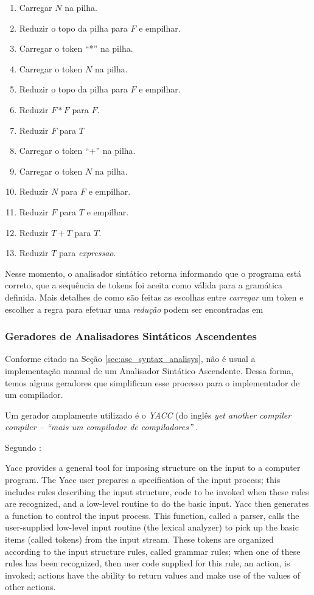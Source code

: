 \begin{enumerate}
  \item Carregar $N$ na pilha.
  \item Reduzir o topo da pilha para $F$ e empilhar.
  \item Carregar o token ``*'' na pilha.
  \item Carregar o token $N$ na pilha.
  \item Reduzir o topo da pilha para $F$ e empilhar.
  \item Reduzir $F*F$ para $F$.
	\item Reduzir $F$ para $T$
  \item Carregar o token ``+'' na pilha.
  \item Carregar o token $N$ na pilha.
  \item Reduzir $N$ para $F$ e empilhar.
  \item Reduzir $F$ para $T$ e empilhar.
  \item Reduzir $T+T$ para $T$.
	\item Reduzir $T$ para \emph{expressao}.
\end{enumerate}

Nesse momento, o analisador sintático retorna informando que o programa está
correto, que a sequência de tokens foi aceita como válida para a gramática
definida. Mais detalhes de como são feitas as escolhas entre \emph{carregar} um token
e escolher a regra para efetuar uma \emph{redução} podem ser encontradas em

\subsubsection{Geradores de Analisadores Sintáticos Ascendentes}
\label{sec:yacc}

Conforme citado na Seção \ref{sec:asc_syntax_analisys}, não é usual a
implementação manual de um Analisador Sintático Ascendente. Dessa forma, temos
alguns geradores que simplificam esse processo para o implementador de um
compilador.

Um gerador amplamente utilizado é o \emph{YACC} (do inglês \emph{yet another
compiler compiler {--} ``mais um compilador de compiladores''}
\cite{louden97-pt}.

Segundo :

\begin{citacao}{4cm}{0cm}
Yacc provides a general tool for imposing structure on the input to a computer
program. The Yacc user prepares a specification of the input process; this
includes rules describing the input structure, code to be invoked when these
rules are recognized, and a low-level routine to do the basic input. Yacc then
generates a function to control the input process. This function, called a
parser, calls the user-supplied low-level input routine (the lexical analyzer)
to pick up the basic items (called tokens) from the input stream. These tokens
are organized according to the input structure rules, called grammar rules;
when one of these rules has been recognized, then user code supplied for this
rule, an action, is invoked; actions have the ability to return values and
make use of the values of other actions.
\end{citacao}

